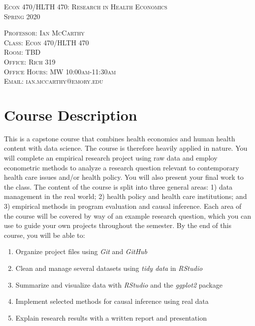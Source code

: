 \documentclass{article}
\begin{document}
\thispagestyle{empty}

\begin{center}
\textsc{\Large{Econ 470/HLTH 470: Research in Health Economics}} \\
\textsc{\large{Spring 2020}}
\end{center}

\noindent \textsc{Professor: Ian McCarthy} \\
\noindent \textsc{Class: Econ 470/HLTH 470} \\
\noindent \textsc{Room: TBD}  \\
\noindent \textsc{Office: Rich 319} \\
\noindent \textsc{Office Hours: MW 10:00am-11:30am} \\
\noindent \textsc{Email: ian.mccarthy@emory.edu} \\

\section*{Course Description}
This is a capstone course that combines health economics and human health content with data science. The course is therefore heavily applied in nature. You will complete an empirical research project using raw data and employ econometric methods to analyze a research question relevant to contemporary health care issues and/or health policy. You will also present your final work to the class. The content of the course is split into three general areas: 1) data management in the real world; 2) health policy and health care institutions; and 3) empirical methods in program evaluation and causal inference. Each area of the course will be covered by way of an example research question, which you can use to guide your own projects throughout the semester. By the end of this course, you will be able to:
\begin{enumerate}
 \item Organize project files using \textit{Git} and \textit{GitHub}
 \item Clean and manage several datasets using \textit{tidy data} in \textit{RStudio}
 \item Summarize and visualize data with \textit{RStudio} and the \textit{ggplot2} package
 \item Implement selected methods for causal inference using real data
 \item Explain research results with a written report and presentation
\end{enumerate}
\end{document}

